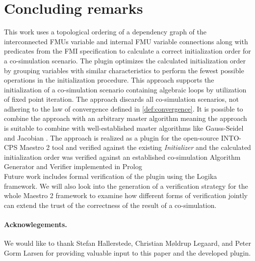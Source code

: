 \section{Concluding remarks}\label{sc:summary}
This work uses a topological ordering of a dependency graph of the interconnected FMUs variable and internal FMU variable connections along with predicates from the FMI specification to calculate a correct initialization order for a co-simulation scenario. The plugin optimizes the calculated initialization order by grouping variables with similar characteristics to perform the fewest possible operations in the initialization procedure.
This approach supports the initialization of a co-simulation scenario containing algebraic loops by utilization of fixed point iteration. The approach discards all co-simulation scenarios, not adhering to the law of convergence defined in \cref{def:convergence}.
It is possible to combine the approach with an arbitrary master algorithm meaning the approach is suitable to combine with well-established master algorithms like Gauss-Seidel and Jacobian \cite{Palensky2017}. 
The approach is realized as a plugin for the open-source INTO-CPS Maestro 2 tool and verified against the existing \textit{Initializer} and the calculated initialization order was verified against an established co-simulation Algorithm Generator and Verifier implemented in Prolog\cite{gomes_lucio_vangheluwe_2019}\\
Future work includes formal verification of the plugin using the Logika framework\cite{inbook}.
We will also look into the generation of a verification strategy for the whole Maestro 2 framework to examine how different forms of verification jointly can extend the trust of the correctness of the result of a co-simulation. 

\paragraph*{\textbf{Acknowlegements.}}We would like to thank Stefan Hallerstede, Christian Møldrup Legaard, and Peter Gorm Larsen for providing valuable input to this paper and the developed plugin.